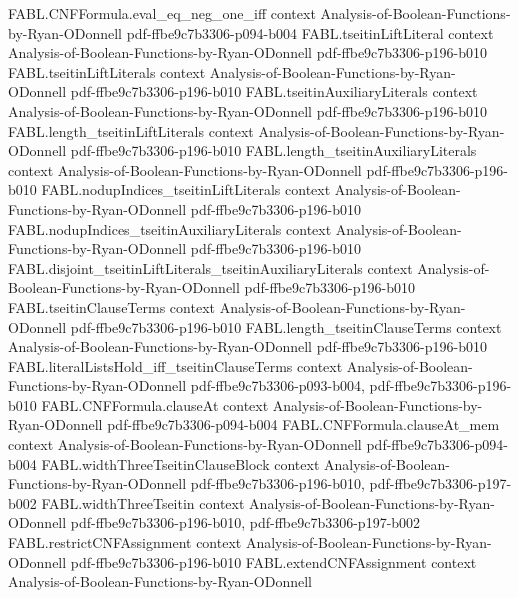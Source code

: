 \begin{theorem}
\proofstep
  {FABL.CNFFormula.eval_eq_neg_one_iff}
  {context}
  {Analysis-of-Boolean-Functions-by-Ryan-ODonnell}
  {pdf-ffbe9c7b3306-p094-b004}
\proofstep
  {FABL.tseitinLiftLiteral}
  {context}
  {Analysis-of-Boolean-Functions-by-Ryan-ODonnell}
  {pdf-ffbe9c7b3306-p196-b010}
\proofstep
  {FABL.tseitinLiftLiterals}
  {context}
  {Analysis-of-Boolean-Functions-by-Ryan-ODonnell}
  {pdf-ffbe9c7b3306-p196-b010}
\proofstep
  {FABL.tseitinAuxiliaryLiterals}
  {context}
  {Analysis-of-Boolean-Functions-by-Ryan-ODonnell}
  {pdf-ffbe9c7b3306-p196-b010}
\proofstep
  {FABL.length_tseitinLiftLiterals}
  {context}
  {Analysis-of-Boolean-Functions-by-Ryan-ODonnell}
  {pdf-ffbe9c7b3306-p196-b010}
\proofstep
  {FABL.length_tseitinAuxiliaryLiterals}
  {context}
  {Analysis-of-Boolean-Functions-by-Ryan-ODonnell}
  {pdf-ffbe9c7b3306-p196-b010}
\proofstep
  {FABL.nodupIndices_tseitinLiftLiterals}
  {context}
  {Analysis-of-Boolean-Functions-by-Ryan-ODonnell}
  {pdf-ffbe9c7b3306-p196-b010}
\proofstep
  {FABL.nodupIndices_tseitinAuxiliaryLiterals}
  {context}
  {Analysis-of-Boolean-Functions-by-Ryan-ODonnell}
  {pdf-ffbe9c7b3306-p196-b010}
\proofstep
  {FABL.disjoint_tseitinLiftLiterals_tseitinAuxiliaryLiterals}
  {context}
  {Analysis-of-Boolean-Functions-by-Ryan-ODonnell}
  {pdf-ffbe9c7b3306-p196-b010}
\proofstep
  {FABL.tseitinClauseTerms}
  {context}
  {Analysis-of-Boolean-Functions-by-Ryan-ODonnell}
  {pdf-ffbe9c7b3306-p196-b010}
\proofstep
  {FABL.length_tseitinClauseTerms}
  {context}
  {Analysis-of-Boolean-Functions-by-Ryan-ODonnell}
  {pdf-ffbe9c7b3306-p196-b010}
\proofstep
  {FABL.literalListsHold_iff_tseitinClauseTerms}
  {context}
  {Analysis-of-Boolean-Functions-by-Ryan-ODonnell}
  {pdf-ffbe9c7b3306-p093-b004,
    pdf-ffbe9c7b3306-p196-b010}
\proofstep
  {FABL.CNFFormula.clauseAt}
  {context}
  {Analysis-of-Boolean-Functions-by-Ryan-ODonnell}
  {pdf-ffbe9c7b3306-p094-b004}
\proofstep
  {FABL.CNFFormula.clauseAt_mem}
  {context}
  {Analysis-of-Boolean-Functions-by-Ryan-ODonnell}
  {pdf-ffbe9c7b3306-p094-b004}
\proofstep
  {FABL.widthThreeTseitinClauseBlock}
  {context}
  {Analysis-of-Boolean-Functions-by-Ryan-ODonnell}
  {pdf-ffbe9c7b3306-p196-b010,
    pdf-ffbe9c7b3306-p197-b002}
\proofstep
  {FABL.widthThreeTseitin}
  {context}
  {Analysis-of-Boolean-Functions-by-Ryan-ODonnell}
  {pdf-ffbe9c7b3306-p196-b010,
    pdf-ffbe9c7b3306-p197-b002}
\proofstep
  {FABL.restrictCNFAssignment}
  {context}
  {Analysis-of-Boolean-Functions-by-Ryan-ODonnell}
  {pdf-ffbe9c7b3306-p196-b010}
\proofstep
  {FABL.extendCNFAssignment}
  {context}
  {Analysis-of-Boolean-Functions-by-Ryan-ODonnell}

\end{theorem}
